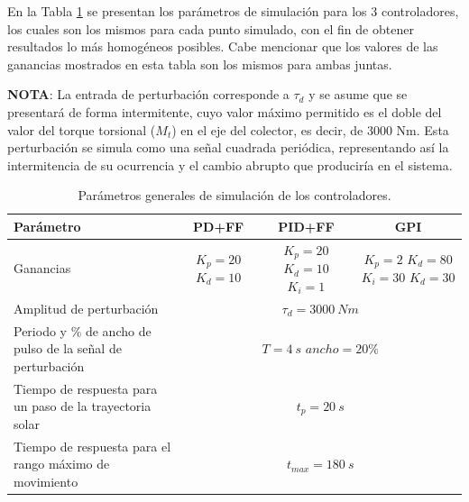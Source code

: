 En la Tabla \ref{tab:control1} se presentan los parámetros de simulación para los 3 controladores, los cuales son los mismos para cada punto simulado, con el fin de obtener resultados lo más homogéneos posibles. Cabe mencionar que los valores de las ganancias mostrados en esta tabla son los mismos para ambas juntas.

\textbf{NOTA}: La entrada de perturbación corresponde a $ \tau_d $ y se asume que se presentará de forma intermitente, cuyo valor máximo permitido es el doble del valor del torque torsional ($ M_t $) en el eje del colector, es decir, de 3000 Nm. Esta perturbación se simula como una señal cuadrada periódica, representando así la intermitencia de su ocurrencia y el cambio abrupto que produciría en el sistema.

\begin{table}[H]
  \centering
  \caption{Parámetros generales de simulación de los controladores.}
    \begin{tabular}{|p{4.5cm}|ccc|}
    \hline
    \textbf{Parámetro} & \multicolumn{1}{p{1.5cm}|}{\textbf{PD+FF}} & \multicolumn{1}{p{1.5cm}|}{\textbf{PID+FF}} & \multicolumn{1}{p{1.5cm}|}{\textbf{GPI}} \\
    \hline \hline  
    Ganancias & \multicolumn{1}{p{1.5cm}|}{$ K_p=20 $ \newline{} $ K_d=10 $} & \multicolumn{1}{p{1.5cm}|}{$ K_p=20 $ \newline{} $ K_d=10 $ \newline{} $ K_i=1 $} & \multicolumn{1}{p{1.5cm}|}{$ K_p=2 $ \newline{} $ K_d=80 $ \newline{} $ K_i=30 $ \newline{} $ K_d=30 $} \\
    \hline
    Amplitud de perturbación & \multicolumn{3}{c|}{$ \tau_d=3000\ Nm $} \\
    \hline
    Periodo y \% de ancho de pulso de la señal de perturbación & \multicolumn{3}{p{3cm}|}{$ T=4\ s $ \newline{} $ ancho=20\% $} \\
    \hline
    Tiempo de respuesta para un paso de la trayectoria solar & \multicolumn{3}{c|}{$ t_p=20\ s $} \\
    \hline
    Tiempo de respuesta para el rango máximo de movimiento & \multicolumn{3}{c|}{$ t_{max}=180\ s $} \\
    \hline
    \end{tabular}%
  \label{tab:control1}%
\end{table}%

